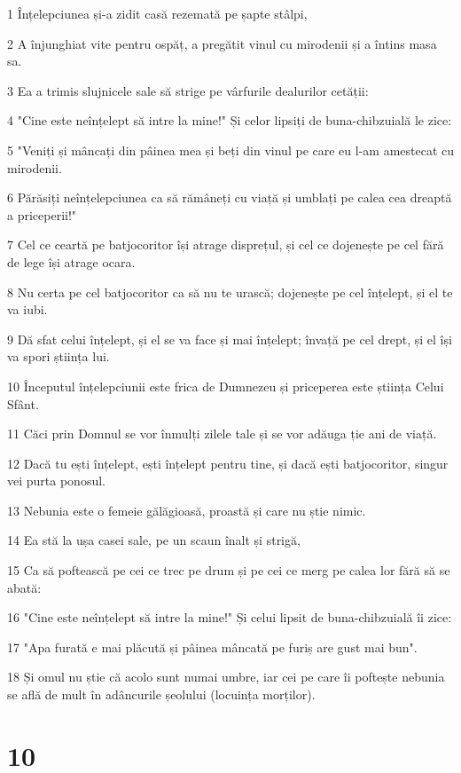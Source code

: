 \par 1 Înțelepciunea și-a zidit casă rezemată pe șapte stâlpi,
\par 2 A înjunghiat vite pentru ospăț, a pregătit vinul cu mirodenii și a întins masa sa.
\par 3 Ea a trimis slujnicele sale să strige pe vârfurile dealurilor cetății:
\par 4 "Cine este neînțelept să intre la mine!" Și celor lipsiți de buna-chibzuială le zice:
\par 5 "Veniți și mâncați din pâinea mea și beți din vinul pe care eu l-am amestecat cu mirodenii.
\par 6 Părăsiți neînțelepciunea ca să rămâneți cu viață și umblați pe calea cea dreaptă a priceperii!"
\par 7 Cel ce ceartă pe batjocoritor își atrage disprețul, și cel ce dojenește pe cel fără de lege își atrage ocara.
\par 8 Nu certa pe cel batjocoritor ca să nu te urască; dojenește pe cel înțelept, și el te va iubi.
\par 9 Dă sfat celui înțelept, și el se va face și mai înțelept; învață pe cel drept, și el își va spori știința lui.
\par 10 Începutul înțelepciunii este frica de Dumnezeu și priceperea este știința Celui Sfânt.
\par 11 Căci prin Domnul se vor înmulți zilele tale și se vor adăuga ție ani de viață.
\par 12 Dacă tu ești înțelept, ești înțelept pentru tine, și dacă ești batjocoritor, singur vei purta ponosul.
\par 13 Nebunia este o femeie gălăgioasă, proastă și care nu știe nimic.
\par 14 Ea stă la ușa casei sale, pe un scaun înalt și strigă,
\par 15 Ca să poftească pe cei ce trec pe drum și pe cei ce merg pe calea lor fără să se abată:
\par 16 "Cine este neînțelept să intre la mine!" Și celui lipsit de buna-chibzuială îi zice:
\par 17 "Apa furată e mai plăcută și pâinea mâncată pe furiș are gust mai bun".
\par 18 Și omul nu știe că acolo sunt numai umbre, iar cei pe care îi poftește nebunia se află de mult în adâncurile șeolului (locuința morților).

\chapter{10}

